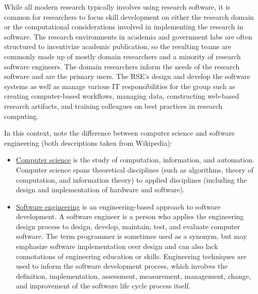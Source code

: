\documentclass[]{nrel}
\begin{document}
\begin{appendices}
While all modern research typically involves using research software, it is common for researchers
to focus skill development on either the research domain or the computational considerations
involved in implementing the research in software.
The research environments in academia and government labs are often structured to incentivize
academic publication, so the resulting teams are commonly made up of mostly domain researchers
and a minority of research software engineers.
The domain researchers inform the needs of the research software and are the primary users.
The RSE's design and develop the software systems as well as manage various IT responsibilities
for the group such as creating computer-based workflows, managing data, constructing web-based
research artifacts, and training colleagues on best practices in research computing.

In this context, note the difference between computer science and software engineering (both
descriptions taken from Wikipedia):
\begin{itemize}
\item \href{https://en.wikipedia.org/wiki/Computer_science}{Computer science} is the study of
    computation, information, and automation.
    Computer science spans theoretical disciplines (such as algorithms, theory of computation,
    and information theory) to applied disciplines (including the design and implementation of
    hardware and software).
    
\item \href{https://en.wikipedia.org/wiki/Software_engineering}{Software engineering} is an
    engineering-based approach to software development. A software
    engineer is a person who applies the engineering design process to design, develop, maintain,
    test, and evaluate computer software. The term programmer is sometimes used as a synonym,
    but may emphasize software implementation over design and can also lack connotations of
    engineering education or skills.
    Engineering techniques are used to inform the software development process, which involves the
    definition, implementation, assessment, measurement, management, change, and improvement of
    the software life cycle process itself.
\end{itemize}


\end{appendices}
\end{document}
